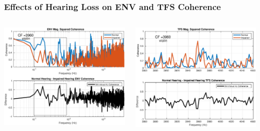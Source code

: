 \documentclass[aspectratio=1610]{beamer}
\begin{document}
\begin{frame}
\frametitle{Effects of Hearing Loss on ENV and TFS Coherence} 

\begin{columns}
\begin{column}{0.55\textwidth}
\includegraphics[scale = .4]{violin_ENV_COH_3960}
\end{column}
\begin{column}{0.56\textwidth}
\includegraphics[scale = .4]{violin_TFS_COH_3960}
\end{column}
\end{columns}

\end{frame}
\end{document}
